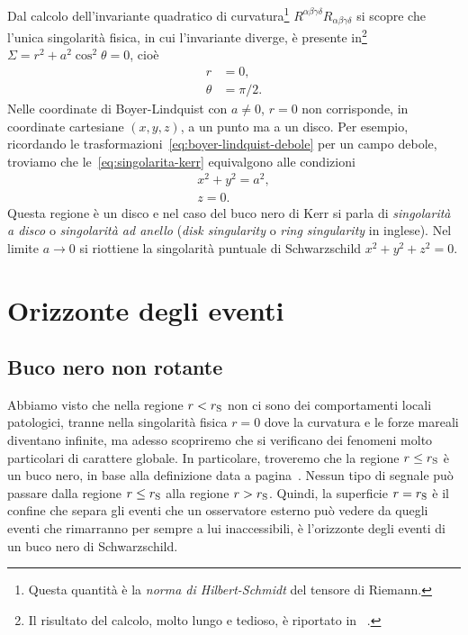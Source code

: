 Dal calcolo dell'invariante quadratico di curvatura\footnote{Questa quantità è
  la \emph{norma di Hilbert-Schmidt} del tensore di Riemann.}
\(R^{\alpha\beta\gamma\delta}R_{\alpha\beta\gamma\delta}\) si scopre che l'unica
singolarità fisica, in cui l'invariante diverge, è presente in\footnote{Il
  risultato del calcolo, molto lungo e tedioso, è riportato in
  ~\textcite{2007arXiv0706.0622V}.} \(\Sigma = r^{2} + a^{2}\cos^{2}\theta =
0\), cioè
\begin{subequations}
  \label{eq:singolarita-kerr}
  \begin{align}
    r &= 0, \\
    \theta &= \pi/2.
  \end{align}
\end{subequations}
Nelle coordinate di Boyer-Lindquist con \(a \neq 0\), \(r = 0\) non corrisponde,
in coordinate cartesiane \((x, y, z)\), a un punto ma a un disco.  Per esempio,
ricordando le trasformazioni~\eqref{eq:boyer-lindquist-debole} per un campo
debole, troviamo che le~\eqref{eq:singolarita-kerr} equivalgono alle condizioni
\begin{subequations}
  \begin{gather}
    x^{2} + y^{2} = a^{2}, \\
    z = 0.
  \end{gather}
\end{subequations}
Questa regione è un disco e nel caso del buco nero di Kerr si parla di
\emph{singolarità a disco} o \emph{singolarità ad anello} (\emph{disk
  singularity} o \emph{ring singularity} in inglese).  Nel limite \(a\to 0\) si
riottiene la singolarità puntuale di Schwarzschild \(x^{2} + y^{2} + z^{2} =
0\).

\section{Orizzonte degli eventi}
\label{sec:orizzonte-eventi}

\subsection{Buco nero non rotante}
\label{sec:orizzonte-schwarzschild}

Abbiamo visto che nella regione \(r < r_{\textup{S}}\) non ci sono dei
comportamenti locali patologici, tranne nella singolarità fisica \(r = 0\) dove
la curvatura e le forze mareali diventano infinite, ma adesso scopriremo che si
verificano dei fenomeni molto particolari di carattere globale.  In particolare,
troveremo che la regione \(r \leq r_{\textup{S}}\) è un buco nero, in base alla
definizione data a pagina~\pageref{definizione-buco-nero}.  Nessun tipo di
segnale può passare dalla regione \(r\leq r_{\textup{S}}\) alla regione \(r >
r_{\textup{S}}\).  Quindi, la superficie \(r = r_{\textup{S}}\) è il confine che
separa gli eventi che un osservatore esterno può vedere da quegli eventi che
rimarranno per sempre a lui inaccessibili, è l'orizzonte degli eventi di un buco
nero di Schwarzschild.

